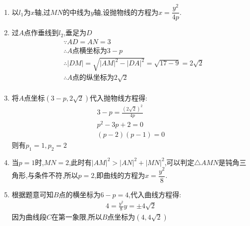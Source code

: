 \begin{questions}
\begin{figure*}[htbp]
	\end{figure*}

	\begin{solution}
		\begin{enumerate}[label=\protect\circled{\arabic*}]
			\item 以$l_1$为$x$轴,过$MN$的中线为$y$轴,设抛物线的方程为$x=\dfrac{y^2}{4p}$.
			\item 过$A$点作垂线到$l_2$,垂足为$D$
			      \begin{align*}
				       & \because AD = AN = 3                                                  \\
				       & \therefore A \text{点横坐标为} 3-p                                         \\
				       & \therefore  |DM| = \sqrt{|AM|^2 - |DA|^2} = \sqrt{17 - 9} = 2\sqrt{2} \\
				       & \therefore A\text{点的纵坐标为}2\sqrt{2}                                    \\
			      \end{align*}
			\item 将$A$点坐标$(3-p, 2\sqrt{2})$代入抛物线方程得:
			      \begin{align*}
				      3-p = \frac{(2\sqrt{2})^2}{4p} \\
				      p^2 -3p + 2 = 0                \\
				      (p-2)(p-1) = 0
			      \end{align*}
			      则有$p_1 = 1, p_2 = 2$
			\item 当$p=1$时,$MN=2$,此时有$|AM|^2 > |AN|^2 +
				      |MN|^2$,可以判定$\triangle{AMN}$是钝角三角形,与条件不符,所以$p=2$,即曲线的方程为$x=\dfrac{y^2}{8}$.
			\item 根据题意可知$B$点的横坐标为$6-p=4$,代入曲线方程得:
			      \begin{align*}
				      4 = \frac{y^2}{8}
				      y = \pm4\sqrt{2}
			      \end{align*}
			      因为曲线段$C$在第一象限,所以$B$点坐标为$(4,4\sqrt{2})$


\end{enumerate}
\end{solution}
\end{questions}
